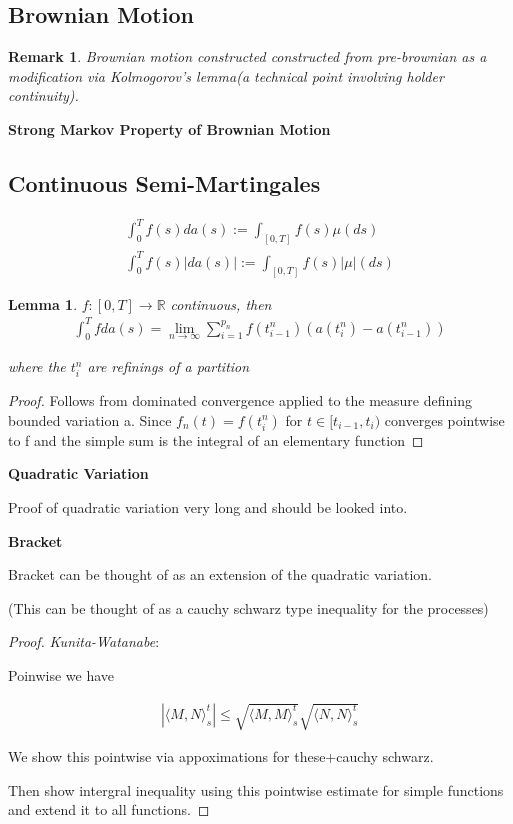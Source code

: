 \documentclass[11pt]{article}
\newcommand{\R}{\mathbb{R}}
\newtheorem{lemma}{Lemma}
\newtheorem{remark}{Remark}
\begin{document}
\subsection{Brownian Motion}

\begin{remark}
	Brownian motion constructed constructed from pre-brownian as a modification via Kolmogorov's lemma(a technical point involving holder continuity). 
\end{remark}



\textbf{Strong Markov Property of Brownian Motion}




\subsection{Continuous Semi-Martingales}

\begin{align*}
	\int_0^T f(s) da(s) := \int_{[0,T]} f(s) \mu(ds)\\
	\int_0^T f(s) |da(s)| := \int_{[0,T]} f(s) |\mu|(ds)
\end{align*}

\begin{lemma}
$f : [0,T] \to \R$ continuous, then
\begin{align*}
	\int_0^T f da(s) = \lim_{n \to \infty}\sum_{i=1}^{p_n} f(t_{i-1}^n)(a(t_i^n) - a(t_{i-1}^n))
\end{align*}

where the $t_i^n$ are refinings of a partition
\end{lemma}

\begin{proof}
	Follows from dominated convergence applied to the measure defining bounded variation a. Since $f_n(t) = f(t_{i}^n)$ for $t \in [t_{i-1},t_i)$ converges pointwise to f and the simple sum is the integral of an elementary function
	\end{proof}

\textbf{Quadratic Variation}

Proof of quadratic variation very long and should be looked into.

\textbf{Bracket}

Bracket can be thought of as an extension of the quadratic variation.

(This can be thought of as a cauchy schwarz type inequality for the processes)
\begin{proof}
\textit{Kunita-Watanabe}:

Poinwise we have 

\begin{align*}
	|\langle M, N \rangle_s^t| \leq \sqrt{\langle M,M \rangle_s^t}\sqrt{\langle N,N \rangle_s^t}
\end{align*}

We show this pointwise via appoximations for these+cauchy schwarz.

Then show intergral inequality using this pointwise estimate for simple functions and extend it to all functions.

\end{proof}
\end{document}
